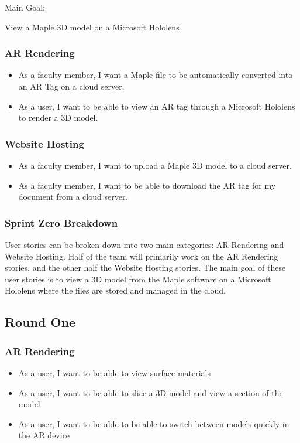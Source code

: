Main Goal:

View a Maple 3D model on a Microsoft Hololens

\subsubsection{AR Rendering}

\begin{itemize}
	\item As a faculty member, I want a Maple file to be automatically converted into an AR Tag on a cloud server.
	\item As a user, I want to be able to view an AR tag through a Microsoft Hololens to render a 3D model.
\end{itemize}

\subsubsection{Website Hosting}

\begin{itemize}
	\item As a faculty member, I want to upload a Maple 3D model to a cloud server.
	\item As a faculty member, I want to be able to download the AR tag for my document from a cloud server.
\end{itemize}

\subsubsection{Sprint Zero Breakdown}
User stories can be broken down into two main categories: AR Rendering and Website Hosting.  Half of the team will primarily work on 
the AR Rendering stories, and the other half the Website Hosting stories.  The main goal of these user stories is to view a
3D model from the Maple software on a Microsoft Hololens where the files are stored and managed in the cloud.

\subsection{Round One}

\subsubsection{AR Rendering}

\begin{itemize}
	\item As a user, I want to be able to view surface materials
	\item As a user, I want to be able to slice a 3D model and view a section of the model
	\item As a user, I want to be able to be able to switch between models quickly in the AR device
\end{itemize}


